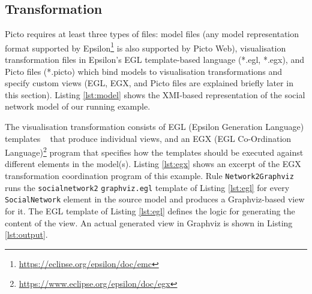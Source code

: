 \documentclass[preprint,12pt, a4paper]{elsarticle}
\begin{document}
\subsection{Transformation}
\label{sec:transformation}

Picto requires at least three types of files: model files (any model representation format supported by Epsilon\footnote{\url{https://eclipse.org/epsilon/doc/emc}} is also supported by Picto Web), visualisation transformation files in Epsilon's EGL template-based language (*.egl, *.egx), and Picto files (*.picto) which bind models to visualisation transformations and specify custom views (EGL, EGX, and Picto files are explained briefly later in this section). Listing \ref{lst:model} shows the XMI-based representation of the social network model of our running example. 

The visualisation transformation consists of EGL (Epsilon Generation Language) templates ~\cite{rose2008egl} that produce individual views, and an EGX (EGL Co-Ordination Language)\footnote{\url{https://www.eclipse.org/epsilon/doc/egx}} program that specifies how the templates should be executed against different elements in the model(s). Listing \ref{lst:egx} shows an excerpt of the EGX transformation coordination program of this example. Rule \texttt{Network2Graphviz} runs the \texttt{socialnetwork2} \texttt{graphviz.egl} template of Listing \ref{lst:egl} for every \texttt{SocialNetwork} element in the source model and produces a Graphviz-based view for it. The EGL template of Listing \ref{lst:egl} defines the logic for generating the content of the view. An actual generated view in Graphviz is shown in Listing \ref{lst:output}. 
\end{document}
